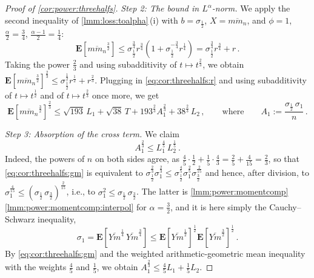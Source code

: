 \documentclass{article}
\newcommand{\lab}{\left[} %
\newcommand{\rab}{\right]} %
\newcommand{\ab}[1]{\lab #1 \rab} %
\newcommand{\abOf}[1]{\!\ab{#1}} %
\newcommand{\lb}{\left(} %
\newcommand{\rb}{\right)} %
\newcommand{\br}[1]{\lb #1 \rb} %
\newcommand{\E}{\mathbf{E}} %
\newcommand{\EOf}[1]{\E\abOf{#1}}
\newcommand{\eqcm}{\,,} %
\newcommand{\eqfs}{\,.}
\newcommand{\ol}[2]{\overline{#1#2}}
\begin{document}
\begin{proof}[Proof of \cref{cor:power:threehalfs}]
    \emph{Step 2: The bound in $L^\alpha$-norm.}
    We apply the second inequality of \cref{lmm:loss:toalpha}\,(i) with $b = \sigma_{\frac12}$,
    $X = \ol{m}{m_n}$, and $\phi = 1$, $\frac\alpha2 = \frac34$, $\frac{\alpha-1}2 = \frac14$:
    \begin{equation}
        \EOf{\ol{m}{m_n}^{\frac32}}
        \leq
        \sigma_{\frac12}^{\frac34} r^{\frac34}
        \br{1 + \sigma_{\frac12}^{-\frac34} r^{\frac14}}
        =
        \sigma_{\frac12}^{\frac34} r^{\frac34} + r
        \eqfs
    \end{equation}
    Taking the power $\frac23$ and using subadditivity of $t\mapsto t^{\frac23}$, we obtain
    $\EOf{\ol{m}{m_n}^{\frac32}}^{\frac23} \leq \sigma_{\frac12}^{\frac12} r^{\frac12} + r^{\frac23}$.
    Plugging in \eqref{eq:cor:threehalfs:r} and using subadditivity of $t\mapsto t^{\frac12}$
    and of $t\mapsto t^{\frac23}$ once more, we get
    \begin{equation}\label{eq:cor:threehalfs:four}
        \EOf{\ol{m}{m_n}^{\frac32}}^{\frac23}
        \leq
        \sqrt{193}\, L_1
        +
        \sqrt{38}\, T
        +
        193^{\frac23} A_1^{\frac23}
        +
        38^{\frac23}\, L_2
        \eqcm\qquad\text{where}\qquad
        A_1 := \frac{\sigma_{\frac12}\,\sigma_1}{n}
        \eqfs
    \end{equation}
    
    \emph{Step 3: Absorption of the cross term.}
    We claim
    \begin{equation}\label{eq:cor:threehalfs:gm}
        A_1^{\frac23} \leq L_1^{\frac45}\, L_2^{\frac15}
        \eqfs
    \end{equation}
    Indeed, the powers of $n$ on both sides agree, as $\frac45\cdot\frac12 + \frac15\cdot\frac43 = \frac25+\frac4{15} = \frac23$, so that \eqref{eq:cor:threehalfs:gm} is equivalent to
    $\sigma_{\frac12}^{\frac23} \sigma_1^{\frac23} \leq \sigma_{\frac12}^{\frac45}\sigma_1^{\frac25}\sigma_{\frac32}^{\frac2{15}}$
    and hence, after division, to
    $\sigma_1^{\frac4{15}} \leq \br{\sigma_{\frac12}\,\sigma_{\frac32}}^{\frac2{15}}$,
    i.e., to $\sigma_1^2 \leq \sigma_{\frac12}\,\sigma_{\frac32}$.
    The latter is \cref{lmm:power:momentcomp}\,\ref{lmm:power:momentcomp:interpol} for $\alpha=\frac32$, and it is here simply the Cauchy--Schwarz inequality,
    \begin{equation}
        \sigma_1
        =
        \EOf{\ol Ym^{\frac14}\, \ol Ym^{\frac34}}
        \leq
        \EOf{\ol Ym^{\frac12}}^{\frac12} \EOf{\ol Ym^{\frac32}}^{\frac12}
        \eqfs
    \end{equation}
    By \eqref{eq:cor:threehalfs:gm} and the weighted arithmetic-geometric mean inequality with the weights $\frac45$ and $\frac15$, we obtain
    $A_1^{\frac23} \leq \frac45 L_1 + \frac15 L_2$.
    

\end{proof}
\end{document}

